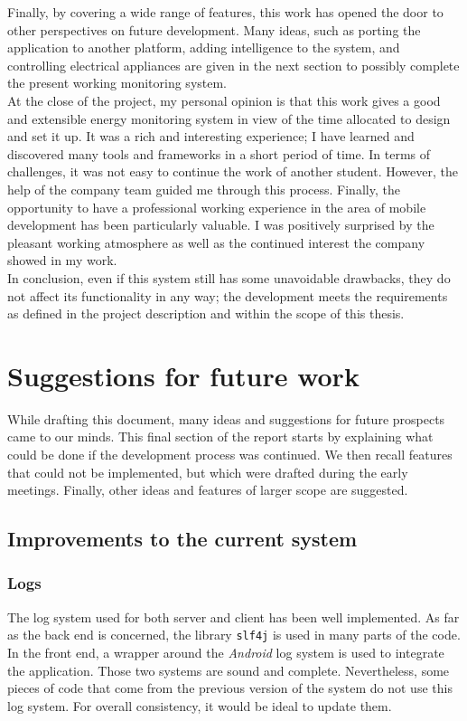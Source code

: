\documentclass[a4paper, oneside, 11pt]{book}
\begin{document}
Finally, by covering a wide range of features, this work has opened the door to other perspectives on future development. Many ideas, such as porting the application to another platform, adding intelligence to the system, and controlling electrical appliances are given in the next section to possibly complete the present working monitoring system.\\

At the close of the project, my personal opinion is that this work gives a good and extensible energy monitoring system in view of the time allocated to design and set it up. It was a rich and interesting experience; I have learned and discovered many tools and frameworks in a short period of time. In terms of challenges, it was not easy to continue the work of another student. However, the help of the company team guided me through this process. Finally, the opportunity to have a professional working experience in the area of mobile development has been particularly valuable. I was positively surprised by the pleasant working atmosphere as well as the continued interest the company showed in my work.\\

In conclusion, even if this system still has some unavoidable drawbacks, they do not affect its functionality in any way; the development meets the requirements as defined in the project description and within the scope of this thesis.

\chapter{Suggestions for future work}
While drafting this document, many ideas and suggestions for future prospects came to our minds. This final section of the report starts by explaining what could be done if the development process was continued. We then recall features that could not be implemented, but which were drafted during the early meetings. Finally, other ideas and features of larger scope are suggested.

\section{Improvements to the current system}

\subsection{Logs}
The log system used for both server and client has been well implemented. As far as the back end is concerned, the library \texttt{slf4j} is used in many parts of the code. In the front end, a wrapper around the \textit{Android} log system is used to integrate the application. Those two systems are sound and complete. Nevertheless, some pieces of code that come from the previous version of the system do not use this log system. For overall consistency, it would be ideal to update them.
\end{document}
